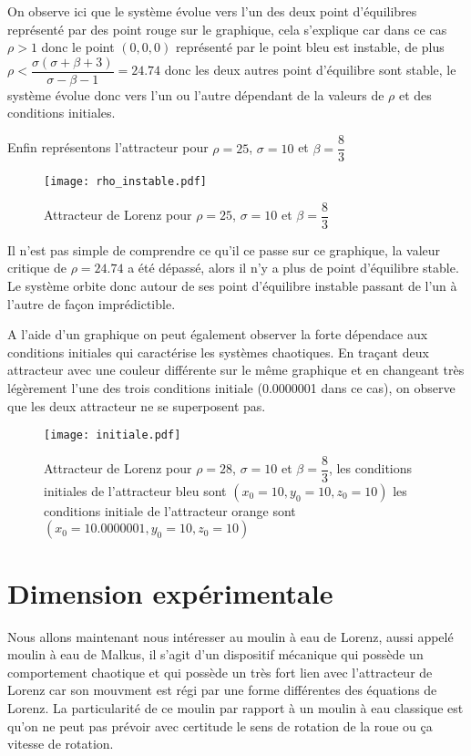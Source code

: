 On observe ici que le système évolue vers l'un des deux point d'équilibres représenté par des point rouge sur le graphique, cela s'explique car dans ce cas $\rho>1$ donc le point $(0,0,0)$ représenté par le point bleu est instable, de plus $\rho < \dfrac{\sigma(\sigma+\beta+3)}{\sigma-\beta-1}=24.74$ donc les deux autres point d'équilibre sont stable, le système évolue donc vers l'un ou l'autre dépendant de la valeurs de $\rho$ et des conditions initiales.  

Enfin représentons l'attracteur pour $\rho=25$, $\sigma=10$ et $\beta=\dfrac{8}{3}$

\begin{figure}
    \texttt{[image: rho\_instable.pdf]}
    \caption{Attracteur de Lorenz pour $\rho=25$, $\sigma=10$ et $\beta=\dfrac{8}{3}$} 
\end{figure}

Il n'est pas simple de comprendre ce qu'il ce passe sur ce graphique, la valeur critique de $\rho=24.74$ a été dépassé, alors il n'y a plus de point d'équilibre stable. Le système orbite donc autour de ses point d'équilibre instable passant de l'un à l'autre de façon imprédictible.

A l'aide d'un graphique on peut également observer la forte dépendace aux conditions initiales qui caractérise les systèmes chaotiques. En traçant deux attracteur avec une couleur différente sur le même graphique et en changeant très légèrement l'une des trois conditions initiale (0.0000001 dans ce cas), on observe que les deux attracteur ne se superposent pas.

\begin{figure}
    \texttt{[image: initiale.pdf]}
    \caption{Attracteur de Lorenz pour $\rho=28$, $\sigma=10$ et $\beta=\dfrac{8}{3}$, les conditions initiales de l'attracteur bleu sont $(x_0=10,y_0=10,z_0=10)$ les conditions initiale de l'attracteur orange sont $(x_0=10.0000001,y_0=10,z_0=10)$} 
\end{figure}

\section{Dimension expérimentale}

Nous allons maintenant nous intéresser au moulin à eau de Lorenz, aussi appelé moulin à eau de Malkus, il s'agit d'un dispositif mécanique qui possède un comportement chaotique et qui possède un très fort lien avec l'attracteur de Lorenz car son mouvment est régi par une forme différentes des équations de Lorenz. La particularité de ce moulin par rapport à un moulin à eau classique est qu'on ne peut pas prévoir avec certitude le sens de rotation de la roue ou ça vitesse de rotation.

